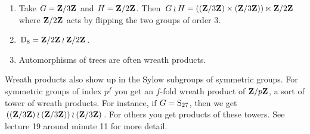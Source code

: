 \documentclass[11pt, oneside]{amsart}
\begin{document}
\begin{example}\text{}
\begin{enumerate}
\item Take $G=\mathbf Z / 3\mathbf Z$ and $H = \mathbf Z / 2\mathbf Z$. Then 
$
G\wr H = ((\mathbf Z / 3\mathbf Z) \times (\mathbf Z / 3\mathbf Z)) \ltimes \mathbf Z / 2\mathbf Z
$ 
where $\mathbf Z / 2\mathbf Z$ acts by flipping the two groups of order $3$.
\item $\operatorname{D}_8 = \mathbf Z/2\mathbf Z \wr \mathbf Z/2\mathbf Z$.
\item Automorphisms of trees are often wreath products. 
\end{enumerate}
\end{example} %

Wreath products also show up in the Sylow subgroups of symmetric groups. For symmetric groups of index $p^f$ you get an $f$-fold wreath product of $\mathbf Z/p\mathbf Z$, a sort of tower of wreath products. For instance, if $G=\operatorname{S}_{27}$, then we get $((\mathbf Z/3\mathbf Z )\wr (\mathbf Z/3\mathbf Z)) \wr (\mathbf Z/3\mathbf Z)$. For others you get products of these towers. See lecture 19 around minute 11 for more detail. %
\end{document}
